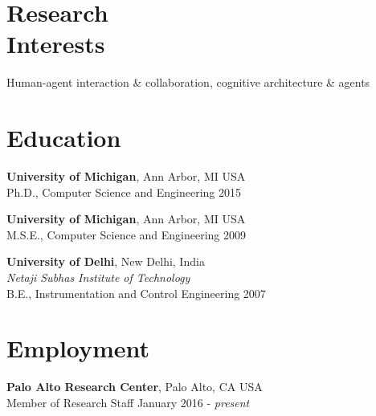 \documentclass[margin,line,11pt]{res}
\begin{document}

\thispagestyle{empty}
\begin{resume}



\section{\sc Research \\Interests}
  Human-agent interaction \& collaboration, cognitive architecture \& agents 

  \section{\sc Education}
          {\bf University of Michigan}, Ann Arbor, MI USA\\
          Ph.D., Computer Science and Engineering \hfill 2015
          
          {\bf University of Michigan}, Ann Arbor, MI USA\\
          M.S.E., Computer Science and Engineering \hfill 2009
          
          {\bf University of Delhi}, New Delhi, India\\
          {\em Netaji Subhas Institute of Technology}\\
          B.E.,  Instrumentation and Control Engineering \hfill 2007
  
\section{\sc Employment}
          {\bf Palo Alto Research Center}, Palo Alto, CA USA \\
          {Member of Research Staff}  \hfill January 2016 - \emph{present}
          

\end{resume}
\end{document}
